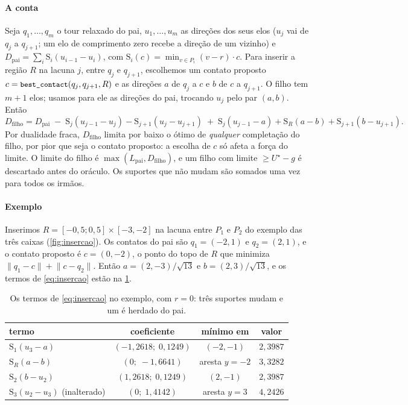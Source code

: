 \documentclass[11pt,a4paper]{article}
\theoremstyle{plain}\newtheorem{proposicao}{Proposição}
\theoremstyle{definition}\newtheorem{definicao}{Definição}
\theoremstyle{plain}\newtheorem{teorema}{Teorema}
\theoremstyle{plain}\newtheorem{lema}{Lema}
\newcommand{\norm}[1]{\lVert#1\rVert}
\newcommand{\code}[1]{\texttt{\small #1}}
\newcommand{\supp}{\mathrm{S}}
\begin{document}
\paragraph{A conta} Seja \(q_1,\dots,q_m\) o tour relaxado do pai, \(u_1,\dots,u_m\) as direções dos seus elos (\(u_j\) vai de \(q_j\) a \(q_{j+1}\); um elo de comprimento zero recebe a direção de um vizinho) e \(D_{\text{pai}}=\sum_i\supp_i(u_{i-1}-u_i)\), com \(\supp_i(c)=\min_{v\in P_i}(v-r)\cdot c\). Para inserir a região \(R\) na lacuna \(j\), entre \(q_j\) e \(q_{j+1}\), escolhemos um contato proposto \(c=\code{best\_contact}(q_j,q_{j+1},R)\) e as direções \(a\) de \(q_j\) a \(c\) e \(b\) de \(c\) a \(q_{j+1}\). O filho tem \(m+1\) elos; usamos para ele as direções do pai, trocando \(u_j\) pelo par \((a,b)\). Então
\begin{equation}\label{eq:insercao}
D_{\text{filho}}=D_{\text{pai}}
\;-\;\supp_j(u_{j-1}-u_j)-\supp_{j+1}(u_j-u_{j+1})
\;+\;\supp_j(u_{j-1}-a)+\supp_R(a-b)+\supp_{j+1}(b-u_{j+1}).
\end{equation}
Por dualidade fraca, \(D_{\text{filho}}\) limita por baixo o ótimo de \emph{qualquer} completação do filho, por pior que seja o contato proposto: a escolha de \(c\) só afeta a força do limite. O limite do filho é \(\max(L_{\text{pai}},D_{\text{filho}})\), e um filho com limite \(\ge U^\star-g\) é descartado antes do oráculo. Os suportes que não mudam são somados uma vez para todos os irmãos.

\paragraph{Exemplo} Inserimos \(R=[-0{,}5;0{,}5]\times[-3,-2]\) na lacuna entre \(P_1\) e \(P_2\) do exemplo das três caixas (\cref{fig:insercao}). Os contatos do pai são \(q_1=(-2,1)\) e \(q_2=(2,1)\), e o contato proposto é \(c=(0,-2)\), o ponto do topo de \(R\) que minimiza \(\norm{q_1-c}+\norm{c-q_2}\). Então \(a=(2,-3)/\sqrt{13}\) e \(b=(2,3)/\sqrt{13}\), e os termos de \eqref{eq:insercao} estão na \cref{tab:insercao}.
\begin{table}[ht]\centering\small
\begin{tabular}{@{}lccc@{}}\toprule
termo & coeficiente & mínimo em & valor\\\midrule
\(\supp_1(u_3-a)\) & \((-1{,}2618;\;0{,}1249)\) & \((-2,-1)\) & \(2{,}3987\)\\
\(\supp_R(a-b)\) & \((0;\;-1{,}6641)\) & aresta \(y=-2\) & \(3{,}3282\)\\
\(\supp_2(b-u_2)\) & \((1{,}2618;\;0{,}1249)\) & \((2,-1)\) & \(2{,}3987\)\\
\(\supp_3(u_2-u_3)\) (inalterado) & \((0;\;1{,}4142)\) & aresta \(y=3\) & \(4{,}2426\)\\\bottomrule
\end{tabular}
\caption{Os termos de \eqref{eq:insercao} no exemplo, com \(r=0\): três suportes mudam e um é herdado do pai.}\label{tab:insercao}
\end{table}
\end{document}

